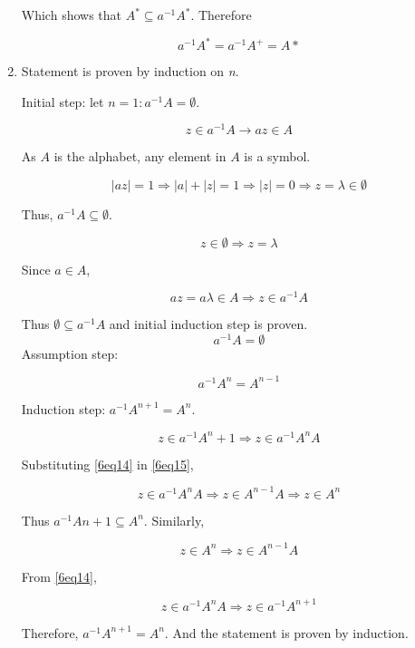 \begin{enumerate}[label=(\alph*)]
Which shows that $A^* \subseteq a^{-1}A^*$. Therefore

\begin{equation}
a^{-1}A^* = a^{-1}A^+ = A* \nonumber
\end{equation}

\item
Statement is proven by induction on \textit{n}.

Initial step: let $n = 1: a^{-1}A = \emptyset $.

\begin{equation}
z \in a^{-1}A \rightarrow az \in A
\end{equation}

As $A$ is the alphabet, any element in $A$ is a symbol.

\begin{equation}
|az| = 1 \Rightarrow |a| + |z| = 1 \Rightarrow |z| = 0 \Rightarrow z = \lambda \in \emptyset
\end{equation}

Thus, $a^{-1}A \subseteq \emptyset$.

\begin{equation}
z \in \emptyset \Rightarrow z = \lambda
\end{equation}

Since $a \in A$,

\begin{equation}
az = a\lambda \in A \Rightarrow z \in a^{-1}A
\end{equation}

Thus $\emptyset \subseteq a^{-1}A$ and initial induction step is proven.
$$ a^{-1}A = \emptyset $$
Assumption step:

\begin{equation}\label{6eq14}
a^{-1}A^n = A^{n-1}
\end{equation}

Induction step: $a^{-1}A^{n+1} = A^n$.

\begin{equation}\label{6eq15}
z \in a^{-1}A^n+1 \Rightarrow z \in a^{-1}A^nA
\end{equation}

Substituting \eqref{6eq14} in \eqref{6eq15},

\begin{equation}
z \in a^{-1}A^nA \Rightarrow z \in A^{n-1}A \Rightarrow z \in A^n
\end{equation}

Thus $a^{-1}A{n+1}\subseteq A^n$. Similarly,

\begin{equation}
z \in A^n \Rightarrow z \in A^{n-1}A
\end{equation}

From \eqref{6eq14},

\begin{equation}
z \in a^{-1}A^nA \Rightarrow z \in a^{-1}A^{n+1}
\end{equation}

Therefore, $a^{-1}A^{n+1}=A^n$.
And the statement is proven by induction.

\end{enumerate}
